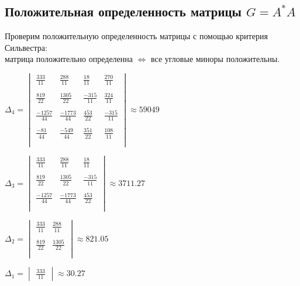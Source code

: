 \documentclass[a4paper]{article}
\begin{document}
\subsection{Положительная определенность матрицы \texorpdfstring{$G = A^{*}A$}{}}
Проверим положительную определенность матрицы с помощью критерия Сильвестра: \\ матрица положительно определенна $\Leftrightarrow$ все угловые миноры положительны.

$
\Delta_4 = \begin{vmatrix}
\frac{333}{11} & \frac{288}{11} & \frac{18}{11} & \frac{270}{11} \\\\
\frac{819}{22} & \frac{1305}{22} & \frac{-315}{11} & \frac{324}{11} \\\\
\frac{-1257}{44} & \frac{-1773}{44} & \frac{453}{22} & \frac{-315}{11} \\\\
\frac{-81}{44} & \frac{-549}{44} & \frac{351}{22} & \frac{108}{11} \\\\
\end{vmatrix} \approx 59049
$

$
\Delta_3 = 
\begin{vmatrix}
\frac{333}{11} & \frac{288}{11} & \frac{18}{11} \\\\
\frac{819}{22} & \frac{1305}{22} & \frac{-315}{11}\\\\
\frac{-1257}{44} & \frac{-1773}{44} & \frac{453}{22}  \\\\
\end{vmatrix} \approx 3711.27
$

$
\Delta_2 = 
\begin{vmatrix}
\frac{333}{11} & \frac{288}{11} \\\\
\frac{819}{22} & \frac{1305}{22} \\\\
\end{vmatrix} \approx 821.05
$

$
\Delta_1 = 
\begin{vmatrix}
\frac{333}{11}
\end{vmatrix} \approx 30.27
$
\end{document}

